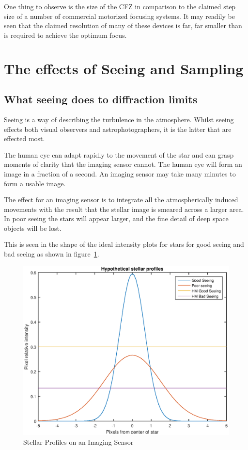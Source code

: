 \documentclass[11pt]{article}
\begin{document}
One thing to observe is the size of the CFZ in comparison to the claimed step size of a number of commercial motorized focusing systems. It may readily be seen that the claimed resolution of many of these devices is far, far smaller than is required to achieve the optimum focus.  

\newpage
\section{The effects of Seeing and Sampling}

\subsection{What seeing does to diffraction limits}
Seeing is a way of describing the turbulence in the atmosphere.  Whilst seeing effects both visual observers and astrophotographers, it is the latter that are effected most.  

The human eye can adapt rapidly to the movement of the star and can grasp moments of clarity that the imaging sensor cannot.  The human eye will form an image in a fraction of a second. An imaging sensor may take many minutes to form a usable image.

The effect for an imaging sensor is to integrate all the atmospherically induced movements with the result that the stellar image is smeared across a larger area.  In poor seeing the stars will appear larger, and the fine detail of deep space objects will be lost.


This is seen in the shape of the ideal intensity plots for stars for good seeing and bad seeing as shown in figure~\ref{fig:stellar-profiles}.

\begin{figure}[htb]
	\begin{center}
		\includegraphics[scale=0.7]{./images/stellar-profiles.eps}
		\caption{Stellar Profiles on an Imaging Sensor}
		\label{fig:stellar-profiles}
	\end{center}
\end{figure}
\end{document}

